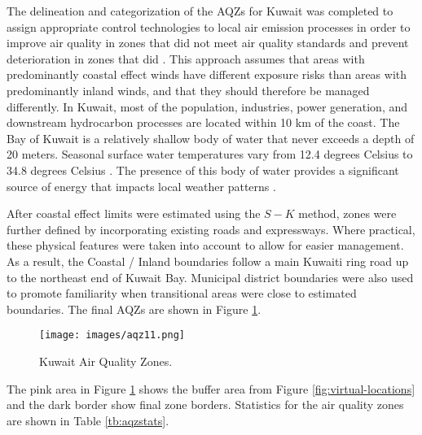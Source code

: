  The delineation and categorization of the AQZs for Kuwait was completed to assign appropriate control technologies to local air emission processes in order to improve air quality in zones that did not meet air quality standards and prevent deterioration in zones that did \citep{Carr2012}. This approach assumes that areas with predominantly coastal effect winds have different exposure risks than areas with predominantly inland winds, and that they should therefore be managed differently.  In Kuwait, most of the population, industries, power generation, and downstream hydrocarbon processes are located within 10 km of the coast.  The Bay of Kuwait is a relatively shallow body of water that never exceeds a depth of 20 meters.  Seasonal surface water temperatures vary from 12.4 degrees Celsius to 34.8 degrees Celsius \citep{Al-Mutairi2014}.  The presence of this body of water provides a significant source of energy that impacts local weather patterns \citep{Mizak2007,Panin2005}. 

After coastal effect limits were estimated using the $S-K$ method, zones were further defined by incorporating existing roads and expressways.  Where practical, these physical features were taken into account to allow for easier management.  As a result, the Coastal / Inland boundaries follow a main Kuwaiti ring road up to the northeast end of Kuwait Bay.  Municipal district boundaries were also used to promote familiarity when transitional areas were close to estimated boundaries.  The final AQZs are shown in Figure \ref{fig:kuwaitzones}.

%
\begin{figure}[H]
\texttt{[image: images/aqz11.png]} 
\caption{Kuwait Air Quality Zones.}
\label{fig:kuwaitzones}
\end{figure}
%

The pink area in Figure \ref{fig:kuwaitzones} shows the buffer area from Figure \ref{fig:virtual-locations} and the dark border show final zone borders. Statistics for the air quality zones are shown in Table \ref{tb:aqzstats}.

